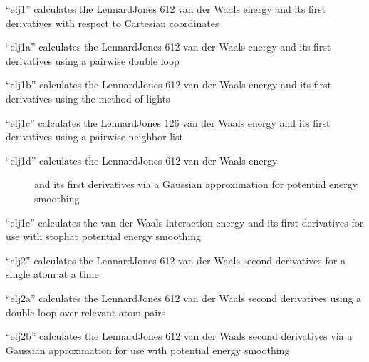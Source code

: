 \documentclass[letterpaper,11pt,english]{sphinxmanual}
\begin{document}

“elj1” calculates the Lennard\sphinxhyphen{}Jones 6\sphinxhyphen{}12 van der Waals energy
and its first derivatives with respect to Cartesian coordinates


“elj1a” calculates the Lennard\sphinxhyphen{}Jones 6\sphinxhyphen{}12 van der Waals energy
and its first derivatives using a pairwise double loop


“elj1b” calculates the Lennard\sphinxhyphen{}Jones 6\sphinxhyphen{}12 van der Waals energy
and its first derivatives using the method of lights


“elj1c” calculates the Lennard\sphinxhyphen{}Jones 12\sphinxhyphen{}6 van der Waals energy
and its first derivatives using a pairwise neighbor list

\begin{description}
\item[{“elj1d” calculates the Lennard\sphinxhyphen{}Jones 6\sphinxhyphen{}12 van der Waals energy}] \leavevmode
and its first derivatives via a Gaussian approximation for
potential energy smoothing

\end{description}


“elj1e” calculates the van der Waals interaction energy and its
first derivatives for use with stophat potential energy smoothing


“elj2” calculates the Lennard\sphinxhyphen{}Jones 6\sphinxhyphen{}12 van der Waals second
derivatives for a single atom at a time


“elj2a” calculates the Lennard\sphinxhyphen{}Jones 6\sphinxhyphen{}12 van der Waals second
derivatives using a double loop over relevant atom pairs


“elj2b” calculates the Lennard\sphinxhyphen{}Jones 6\sphinxhyphen{}12 van der Waals second
derivatives via a Gaussian approximation for use with potential
energy smoothing

\end{document}
